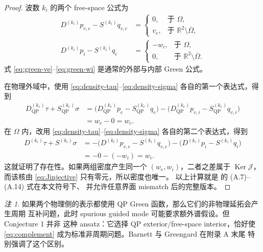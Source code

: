 \documentclass[UTF8,11pt,fontset=fandol]{ctexart}
\newcommand{\Om}{\Omega}
\newcommand{\R}{\mathbb R}
\newcommand{\QP}{\mathrm{QP}}
\newcommand{\Ker}{\operatorname{Ker}}
\theoremstyle{plain}
\theoremstyle{definition}
\theoremstyle{remark}
\newtheorem{remark}[theorem]{注}
\begin{document}
\begin{proof}
波数 \(k_i\) 的两个 free-space 公式为
\begin{align}
D^{(k_i)}p_{v,e}-S^{(k_i)}q_{v,e}
&=\begin{cases}0,&\text{于 }\Om,\\v_e,&\text{于 }\R^2\setminus\overline\Om,
\end{cases}\label{eq:green-ve}\\
D^{(k_i)}p_i-S^{(k_i)}q_i
&=\begin{cases}-w_i,&\text{于 }\Om,\\0,&\text{于 }\R^2\setminus\overline\Om.
\end{cases}\label{eq:green-wi}
\end{align}
式 \eqref{eq:green-ve}--\eqref{eq:green-wi} 是通常的外部与内部 Green 公式。

在物理外域中，使用 \eqref{eq:density-tau}--\eqref{eq:density-sigma}
各自的第一个表达式，得到
\begin{equation}
\begin{aligned}
D_{\QP}^{(k_e)}\tau+S_{\QP}^{(k_e)}\sigma
&=\bigl(D_{\QP}^{(k_e)}p_e-S_{\QP}^{(k_e)}q_e\bigr)
 -\bigl(D_{\QP}^{(k_e)}p_{v,i}-S_{\QP}^{(k_e)}q_{v,i}\bigr)\\
&=w_e-0=w_e.
\end{aligned}
\label{eq:verify-we}
\end{equation}
在 \(\Om\) 内，改用 \eqref{eq:density-tau}--\eqref{eq:density-sigma}
各自的第二个表达式，得到
\begin{equation}
\begin{aligned}
D^{(k_i)}\tau+S^{(k_i)}\sigma
&=-\bigl(D^{(k_i)}p_{v,e}-S^{(k_i)}q_{v,e}\bigr)
 -\bigl(D^{(k_i)}p_i-S^{(k_i)}q_i\bigr)\\
&=-0-(-w_i)=w_i.
\end{aligned}
\label{eq:verify-wi}
\end{equation}
这就证明了存在性。如果两组密度产生同一个 \((w_e,w_i)\)，二者之差属于
\(\Ker\mathcal J\)，而该核由 \eqref{eq:Jinjective} 只有零元，所以密度也唯一。
以上计算就是 \cite{BarnettGreengard2010} 的 (A.7)--(A.14) 式在本文符号下、
并允许任意界面 mismatch 后的完整版本。
\end{proof}

\begin{remark}
如果两个物理侧的表示都使用 QP Green 函数，那么它们的非物理延拓会产生周期
互补问题，此时 spurious guided mode 可能要求额外谱假设。但 Conjecture 1 并非
这种 ansatz：它选择 QP exterior/free-space interior，恰好使
\eqref{eq:complement} 成为标准非周期问题。Barnett 与 Greengard 在附录 A 末尾
特别强调了这个区别。
\end{remark}
\end{document}
